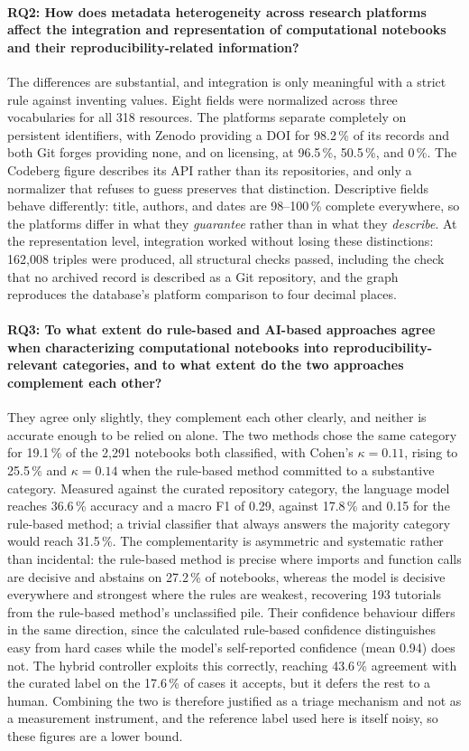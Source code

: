 \paragraph{RQ2: How does metadata heterogeneity across research platforms affect the integration and representation of computational notebooks and their reproducibility-related information?}
The differences are substantial, and integration is only meaningful with a strict rule against inventing values. Eight fields were normalized across three vocabularies for all 318 resources. The platforms separate completely on persistent identifiers, with Zenodo providing a DOI for 98.2\,\% of its records and both Git forges providing none, and on licensing, at 96.5\,\%, 50.5\,\%, and 0\,\%. The Codeberg figure describes its API rather than its repositories, and only a normalizer that refuses to guess preserves that distinction. Descriptive fields behave differently: title, authors, and dates are 98--100\,\% complete everywhere, so the platforms differ in what they \emph{guarantee} rather than in what they \emph{describe}. At the representation level, integration worked without losing these distinctions: 162{,}008 triples were produced, all structural checks passed, including the check that no archived record is described as a Git repository, and the graph reproduces the database's platform comparison to four decimal places.

\paragraph{RQ3: To what extent do rule-based and AI-based approaches agree when characterizing computational notebooks into reproducibility-relevant categories, and to what extent do the two approaches complement each other?}
They agree only slightly, they complement each other clearly, and neither is accurate enough to be relied on alone. The two methods chose the same category for 19.1\,\% of the 2{,}291 notebooks both classified, with Cohen's $\kappa = 0.11$, rising to 25.5\,\% and $\kappa = 0.14$ when the rule-based method committed to a substantive category. Measured against the curated repository category, the language model reaches 36.6\,\% accuracy and a macro F1 of 0.29, against 17.8\,\% and 0.15 for the rule-based method; a trivial classifier that always answers the majority category would reach 31.5\,\%. The complementarity is asymmetric and systematic rather than incidental: the rule-based method is precise where imports and function calls are decisive and abstains on 27.2\,\% of notebooks, whereas the model is decisive everywhere and strongest where the rules are weakest, recovering 193 tutorials from the rule-based method's unclassified pile. Their confidence behaviour differs in the same direction, since the calculated rule-based confidence distinguishes easy from hard cases while the model's self-reported confidence (mean 0.94) does not. The hybrid controller exploits this correctly, reaching 43.6\,\% agreement with the curated label on the 17.6\,\% of cases it accepts, but it defers the rest to a human. Combining the two is therefore justified as a triage mechanism and not as a measurement instrument, and the reference label used here is itself noisy, so these figures are a lower bound.

